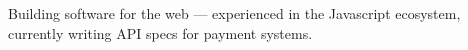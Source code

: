 

\begin{cvparagraph}

Building software for the web — experienced in the Javascript ecosystem, currently writing API specs for payment systems.
\end{cvparagraph}
